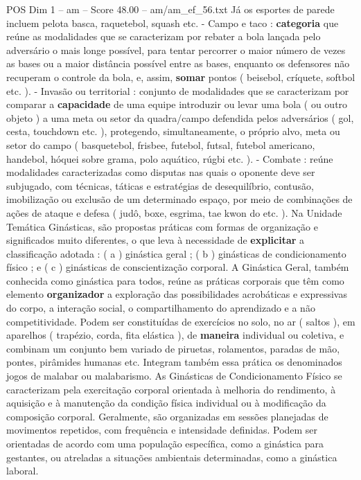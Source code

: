 \begin{textsample}{POS Dim 1 – am – Score 48.00 – am/am\_ef\_56.txt}
Já os esportes de parede incluem pelota basca, raquetebol, squash etc. - Campo e taco : \textbf{categoria} que reúne as modalidades que se caracterizam por rebater a bola lançada pelo adversário o mais longe possível, para tentar percorrer o maior número de vezes as bases ou a maior distância possível entre as bases, enquanto os defensores não recuperam o controle da bola, e, assim, \textbf{somar} pontos ( beisebol, críquete, softbol etc. ). - Invasão ou territorial : conjunto de modalidades que se caracterizam por comparar a \textbf{capacidade} de uma equipe introduzir ou levar uma bola ( ou outro objeto ) a uma meta ou setor da quadra/campo defendida pelos adversários ( gol, cesta, touchdown etc. ), protegendo, simultaneamente, o próprio alvo, meta ou setor do campo ( basquetebol, frisbee, futebol, futsal, futebol americano, handebol, hóquei sobre grama, polo aquático, rúgbi etc. ). - Combate : reúne modalidades caracterizadas como disputas nas quais o oponente deve ser subjugado, com técnicas, táticas e estratégias de desequilíbrio, contusão, imobilização ou exclusão de um determinado espaço, por meio de combinações de ações de ataque e defesa ( judô, boxe, esgrima, tae kwon do etc. ).
Na Unidade Temática Ginásticas, são propostas práticas com formas de organização e significados muito diferentes, o que leva à necessidade de \textbf{explicitar} a classificação adotada : ( a ) ginástica geral ; ( b ) ginásticas de condicionamento físico ; e ( c ) ginásticas de conscientização corporal.
A Ginástica Geral, também conhecida como ginástica para todos, reúne as práticas corporais que têm como elemento \textbf{organizador} a exploração das possibilidades acrobáticas e expressivas do corpo, a interação social, o compartilhamento do aprendizado e a não competitividade.
Podem ser constituídas de exercícios no solo, no ar ( saltos ), em aparelhos ( trapézio, corda, fita elástica ), de \textbf{maneira} individual ou coletiva, e combinam um conjunto bem variado de piruetas, rolamentos, paradas de mão, pontes, pirâmides humanas etc.
Integram também essa prática os denominados jogos de malabar ou malabarismo.
As Ginásticas de Condicionamento Físico se caracterizam pela exercitação corporal orientada à melhoria do rendimento, à aquisição e à manutenção da condição física individual ou à modificação da composição corporal.
Geralmente, são organizadas em sessões planejadas de movimentos repetidos, com frequência e intensidade definidas.
Podem ser orientadas de acordo com uma população específica, como a ginástica para gestantes, ou atreladas a situações ambientais determinadas, como a ginástica laboral.

\end{textsample}
